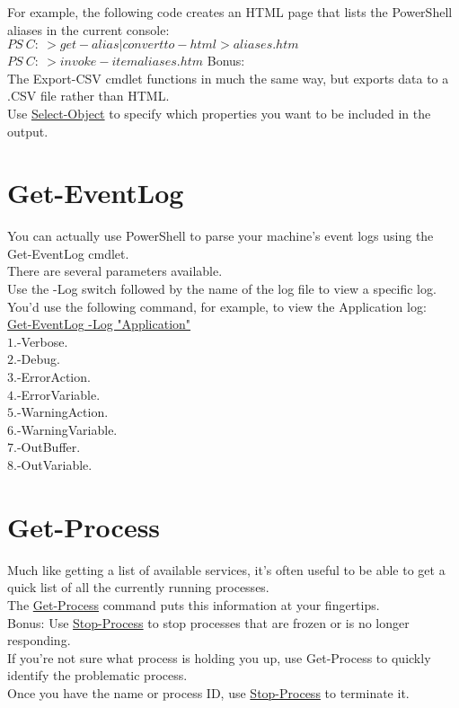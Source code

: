 \documentclass[12pt]{article}
\begin{document}
For example, the following code creates an HTML page that lists the PowerShell aliases in the current console:\\

$PS \ C:\ > get-alias | convertto-html > aliases.htm$\\
$PS \ C:\ > invoke-item aliases.htm$
Bonus: \\
The Export-CSV cmdlet functions in much the same way, but exports data to a .CSV file rather than HTML.\\
 Use \underline{Select-Object} to specify which properties you want to be included in the output.\\



\section{Get-EventLog}
You can actually use PowerShell to parse your machine’s event logs using the Get-EventLog cmdlet.\\
There are several parameters available.\\
Use the -Log switch followed by the name of the log file to view a specific log. \\
You’d use the following command, for example, to view the Application log:\\

\underline{Get-EventLog -Log "Application"} \\

$1.$-Verbose. \\
$2.$-Debug. \\
$3.$-ErrorAction. \\
$4.$-ErrorVariable. \\
$5.$-WarningAction. \\
$6.$-WarningVariable. \\
$7.$-OutBuffer. \\
$8.$-OutVariable. \\
\section{Get-Process}
Much like getting a list of available services, it’s often useful to be able to get a quick list of all the currently running processes.\\
The \underline{Get-Process} command puts this information at your fingertips.\\

Bonus: Use \underline{Stop-Process} to stop processes that are frozen or is no longer responding.\\
If you’re not sure what process is holding you up, use Get-Process to quickly identify the problematic process.\\
Once you have the name or process ID, use \underline{Stop-Process} to terminate it.\\
\end{document}
